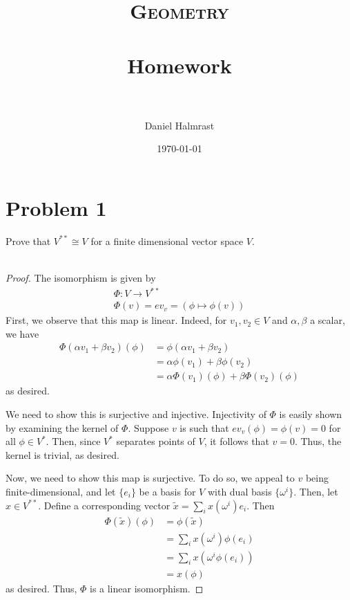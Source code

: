 \documentclass[fontsize=11pt]{scrartcl} %
\title{	
\normalfont \normalsize 
\textsc{Geometry} \\ [25pt] %
\horrule{0.5pt} \\[0.4cm] %
\huge Homework \\ %
\horrule{2pt} \\[0.5cm] %
}
\author{Daniel Halmrast} %
\date{\normalsize\today} %
\numberwithin{equation}{section} %
\numberwithin{figure}{section} %
\numberwithin{table}{section} %
\begin{document}
\maketitle %

\section*{Problem 1}
Prove that $V^{**}\cong V$ for a finite dimensional vector space $V$.
\\
\\
\begin{proof}
    The isomorphism is given by
    \[
        \begin{aligned}
        \Phi:V\to V^{**}\\
        \Phi(v) = ev_v = (\phi\mapsto \phi(v))
    \end{aligned}
    \]
    First, we observe that this map is linear. Indeed, for $v_1,v_2\in V$ and
    $\alpha,\beta$ a scalar, we have
    \[
\begin{aligned}
    \Phi(\alpha v_1 + \beta v_2)(\phi) &= \phi(\alpha v_1 + \beta v_2)\\
    &=\alpha \phi(v_1) + \beta\phi(v_2)\\
    &=\alpha\Phi(v_1)(\phi) + \beta\Phi(v_2)(\phi)
\end{aligned}
    \]
    as desired.

    We need to show this is surjective and injective. Injectivity of $\Phi$ is
    easily shown by examining the kernel of $\Phi$. Suppose $v$ is such that
    $ev_v(\phi)= \phi(v)=0$ for all $\phi\in V^*$. Then, since $V^*$ separates points of
    $V$, it follows that $v=0$. Thus, the kernel is trivial, as desired.

    Now, we need to show this map is surjective. To do so, we appeal to $v$
    being finite-dimensional, and let $\{e_i\}$ be a basis for $V$ with dual
    basis $\{\omega^i\}$. Then, let $x\in V^{**}$. Define a corresponding vector
    $\tilde{x} = \sum_ix(\omega^i)e_i$. Then
    \[
\begin{aligned}
    \Phi(\tilde{x})(\phi) &= \phi(\tilde{x})\\
    &= \sum_i x(\omega^i)\phi(e_i)\\
    &= \sum_i x(\omega^i\phi(e_i))\\
    &= x(\phi)
\end{aligned}
    \]
    as desired. Thus, $\Phi$ is a linear isomorphism.
\end{proof}
\end{document}
